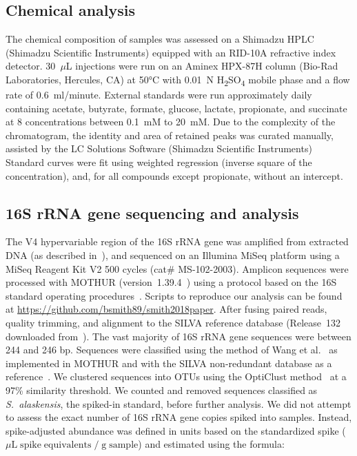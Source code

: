 \documentclass{doc/template/bmcart-nofigbox}
\newcommand{\frnlang}[1]{\textit{#1}}
\newcommand{\taxon}[1]{\frnlang{#1}}
\begin{document}
\subsection*{Chemical analysis}

The chemical composition of samples was assessed
on a Shimadzu HPLC (Shimadzu Scientific Instruments) equipped
with an RID-10A refractive index detector.
30~$\mu$L injections were run on an Aminex HPX-87H column
(Bio-Rad Laboratories, Hercules, CA) at 50°C with 0.01~N H\textsubscript{2}SO\textsubscript{4} mobile
phase and a flow rate of 0.6~ml/minute.
External standards were run approximately daily containing
acetate, butyrate, formate, glucose, lactate, propionate, and succinate
at 8 concentrations between 0.1~mM to 20~mM.
Due to the complexity of the chromatogram, the identity
and area of retained peaks was curated manually,
assisted by the LC Solutions Software (Shimadzu Scientific Instruments)
Standard curves were fit using weighted regression (inverse square of the
concentration), and, for all compounds except propionate,
without an intercept.

\subsection*{16S rRNA gene sequencing and analysis}

The V4 hypervariable region of the 16S rRNA gene was amplified from extracted
DNA (as described in~\cite{Kozich2013}), and sequenced on an Illumina MiSeq
platform using a MiSeq Reagent Kit V2 500 cycles (cat\# MS-102-2003).
Amplicon sequences were processed with MOTHUR (version~1.39.4~\cite{Schloss2009})
using a protocol based on the 16S standard operating procedures~\cite{Kozich2013}.
Scripts to reproduce our analysis can be found at
\url{https://github.com/bsmith89/smith2018paper}.
After fusing paired reads, quality trimming, and alignment to the
SILVA reference database (Release~132 downloaded from~\cite{Schloss2018}).
The vast majority of 16S rRNA gene sequences were between 244 and 246 bp.
Sequences were classified using the method of Wang et al.~\cite{Wang2007} as
implemented in MOTHUR and with the SILVA non-redundant database as a
reference~\cite{Yilmaz2014}.
We clustered sequences into OTUs using the
OptiClust method~\cite{Westcott2017} at a 97\% similarity threshold.
We counted and removed sequences classified as \taxon{S.~alaskensis},
the spiked-in standard, before further analysis.
We did not attempt to assess the exact number of 16S rRNA gene copies spiked
into samples.
Instead, spike-adjusted abundance was defined in units based on
the standardized spike
($\mu\mathrm{L \; spike \; equivalents} \; / \; \mathrm{g \; sample}$)
and estimated using the formula:
\end{document}
